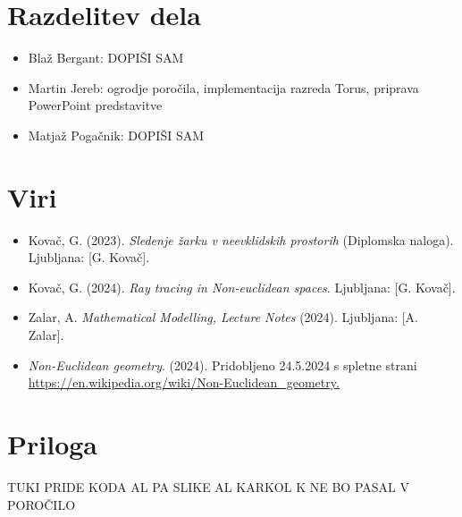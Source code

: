\documentclass[titlepage]{article}
\begin{document}
\section{Razdelitev dela}
\begin{itemize}
  \item Blaž Bergant: DOPIŠI SAM
  \item Martin Jereb: ogrodje poročila, implementacija razreda Torus, priprava PowerPoint predstavitve
  \item Matjaž Pogačnik: DOPIŠI SAM 
\end{itemize}


\section{Viri}
\begin{itemize}
  \item Kovač, G. (2023). \textit{Sledenje žarku v neevklidskih
prostorih} (Diplomska naloga). Ljubljana: [G. Kovač].
  \item Kovač, G. (2024). \textit{Ray tracing in Non-euclidean spaces}. Ljubljana: [G. Kovač].
  \item Zalar, A. \textit{Mathematical Modelling, Lecture Notes} (2024). Ljubljana: [A. Zalar].
    \item \textit{Non-Euclidean geometry}. (2024). Pridobljeno 24.5.2024 s spletne strani \url{https://en.wikipedia.org/wiki/Non-Euclidean_geometry.}
\end{itemize}

\section{Priloga}
TUKI PRIDE KODA AL PA SLIKE AL KARKOL K NE BO PASAL V POROČILO
\end{document}
